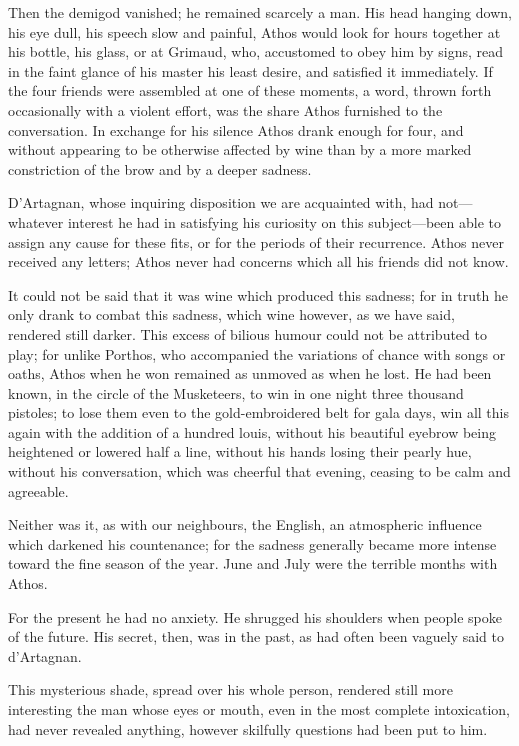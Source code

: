 Then the demigod vanished; he remained scarcely a man. His head hanging down, his eye dull, his speech slow and painful, Athos would look for hours together at his bottle, his glass, or at Grimaud, who, accustomed to obey him by signs, read in the faint glance of his master his least desire, and satisfied it immediately. If the four friends were assembled at one of these moments, a word, thrown forth occasionally with a violent effort, was the share Athos furnished to the conversation. In exchange for his silence Athos drank enough for four, and without appearing to be otherwise affected by wine than by a more marked constriction of the brow and by a deeper sadness. 

D'Artagnan, whose inquiring disposition we are acquainted with, had not---whatever interest he had in satisfying his curiosity on this subject---been able to assign any cause for these fits, or for the periods of their recurrence. Athos never received any letters; Athos never had concerns which all his friends did not know. 

It could not be said that it was wine which produced this sadness; for in truth he only drank to combat this sadness, which wine however, as we have said, rendered still darker. This excess of bilious humour could not be attributed to play; for unlike Porthos, who accompanied the variations of chance with songs or oaths, Athos when he won remained as unmoved as when he lost. He had been known, in the circle of the Musketeers, to win in one night three thousand pistoles; to lose them even to the gold-embroidered belt for gala days, win all this again with the addition of a hundred louis, without his beautiful eyebrow being heightened or lowered half a line, without his hands losing their pearly hue, without his conversation, which was cheerful that evening, ceasing to be calm and agreeable. 

Neither was it, as with our neighbours, the English, an atmospheric influence which darkened his countenance; for the sadness generally became more intense toward the fine season of the year. June and July were the terrible months with Athos. 

For the present he had no anxiety. He shrugged his shoulders when people spoke of the future. His secret, then, was in the past, as had often been vaguely said to d'Artagnan. 

This mysterious shade, spread over his whole person, rendered still more interesting the man whose eyes or mouth, even in the most complete intoxication, had never revealed anything, however skilfully questions had been put to him. 

